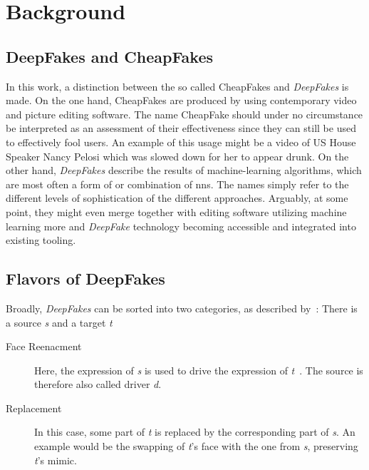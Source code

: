 \section{Background}\label{sect:background}

\subsection{DeepFakes and CheapFakes}
In this work, a distinction between the so called CheapFakes and \textit{DeepFakes}
is made. On the one hand, CheapFakes are produced by using contemporary video 
and picture editing software. The name CheapFake should under no circumstance be
interpreted as an assessment of their effectiveness since they can still be used
to effectively fool users. An example of this usage might be a video of US House
Speaker Nancy Pelosi which was slowed down for her to appear drunk.
On the other hand, \textit{DeepFakes} describe the results of machine-learning
algorithms, which are most often a form of or combination of \glspl{nn}.
The names simply refer to the different levels of sophistication of the different
approaches. Arguably, at some point, they might even merge together with editing 
software utilizing machine learning more and \textit{DeepFake} technology becoming
accessible and integrated into existing tooling.

\subsection{Flavors of DeepFakes}\label{subsubsect:deepfake-flavors}
Broadly, \textit{DeepFakes} can be sorted into two categories, as described by~\textcite{Mirsky.2020}:
There is a source \textit{s} and a target \textit{t}

\begin{description}
    \item[Face Reenacment] Here, the expression of \textit{s} is used to drive
    the expression of \textit{t}~\cite{Mirsky.2020}. The source is
    therefore also called driver \textit{d}.
    \item[Replacement] In this case, some part of \textit{t} is replaced
    by the corresponding part of \textit{s}. An example would be the swapping of
    \textit{t}'s face with the one from \textit{s}, preserving \textit{t}'s mimic.
\end{description}

